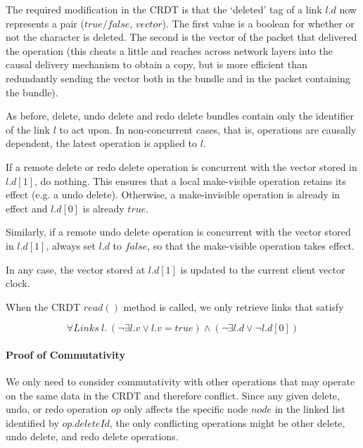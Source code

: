 \documentclass[12pt,a4paper,twoside,openright]{report}
\begin{document}
			The required modification in the CRDT is that the `deleted' tag of a link $l.d$ now represents a pair ($true/false$, $vector$). The first value is a boolean for whether or not the character is deleted. The second is the vector of the packet that delivered the operation (this cheats a little and reaches across network layers into the causal delivery mechanism to obtain a copy, but is more efficient than redundantly sending the vector both in the bundle and in the packet containing the bundle).
			
			As before, delete, undo delete and redo delete bundles contain only the identifier of the link $l$ to act upon. In non-concurrent cases, that is, operations are causally dependent, the latest operation is applied to $l$. 
			
			If a remote delete or redo delete operation is concurrent with the vector stored in $l.d[1]$, do nothing. This ensures that a local make-visible operation retains its effect (e.g. a undo delete). Otherwise, a make-invisible operation is already in effect and $l.d[0]$ is already $true$.
			
			Similarly, if a remote undo delete operation is concurrent with the vector stored in $l.d[1]$, always set $l.d$ to $false$, so that the make-visible operation takes effect.
			
			In any case, the vector stored at $l.d[1]$ is updated to the current client vector clock.
			
			When the CRDT $read()$ method is called, we only retrieve links that satisfy
			
					\[\forall Links\ l.\  (\lnot\exists l.v \lor l.v = true) \land (\lnot\exists l.d \lor \lnot l.d[0]) \] 
						
			
			\paragraph{Proof of Commutativity}
			
			We only need to consider commutativity with other operations that may operate on the same data in the CRDT and therefore conflict. Since any given delete, undo, or redo operation $op$ only affects the specific node $node$ in the linked list identified by $op.deleteId$, the only conflicting operations might be other delete, undo delete, and redo delete operations.
						
\end{document}
